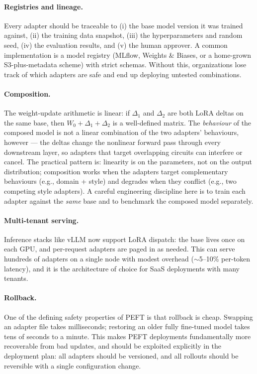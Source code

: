 \paragraph{Registries and lineage.} Every adapter should be traceable
to (i) the base model version it was trained against, (ii) the
training data snapshot, (iii) the hyperparameters and random seed,
(iv) the evaluation results, and (v) the human approver. A common
implementation is a model registry (MLflow, Weights \& Biases, or a
home-grown S3-plus-metadata scheme) with strict schemas. Without
this, organizations lose track of which adapters are safe and end up
deploying untested combinations.

\paragraph{Composition.} The weight-update arithmetic is linear:
if $\Delta_1$ and $\Delta_2$ are both LoRA deltas on the same base,
then $W_0 + \Delta_1 + \Delta_2$ is a well-defined matrix. The
\emph{behaviour} of the composed model is not a linear combination
of the two adapters' behaviours, however --- the deltas change the
nonlinear forward pass through every downstream layer, so adapters
that target overlapping circuits can interfere or cancel. The
practical pattern is: linearity is on the parameters, not on the
output distribution; composition works when the adapters target
complementary behaviours (e.g., domain + style) and degrades when
they conflict (e.g., two competing style adapters). A careful
engineering discipline here is to train each adapter against the
\emph{same} base and to benchmark the composed model separately.

\paragraph{Multi-tenant serving.} Inference stacks like vLLM
\citep{kwon2023vllm} now support LoRA dispatch: the base lives once
on each GPU, and per-request adapters are paged in as needed. This
can serve hundreds of adapters on a single node with modest overhead
($\sim$5--10\% per-token latency), and it is the architecture of
choice for SaaS deployments with many tenants.

\paragraph{Rollback.} One of the defining safety properties of PEFT
is that rollback is cheap. Swapping an adapter file takes
milliseconds; restoring an older fully fine-tuned model takes tens
of seconds to a minute. This makes PEFT deployments fundamentally
more recoverable from bad updates, and should be exploited
explicitly in the deployment plan: all adapters should be versioned,
and all rollouts should be reversible with a single configuration
change.

